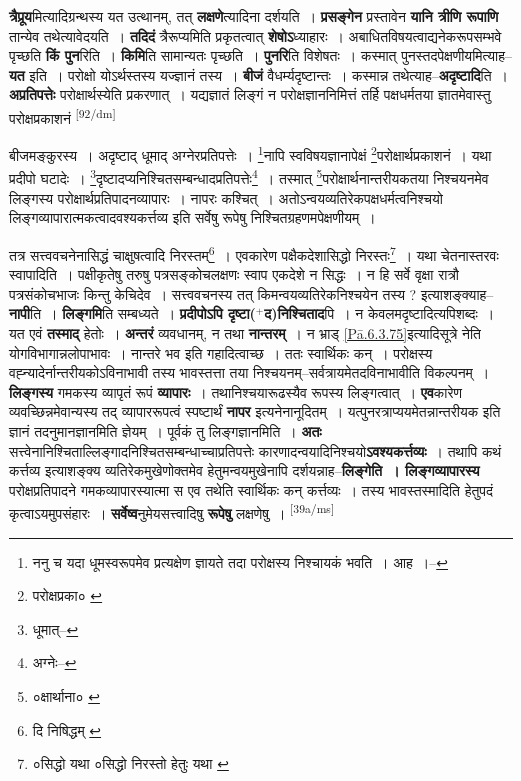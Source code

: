 \documentclass[article,12pt,a4paper]{memoir}
\newcommand{\add}[1]{($^{+}$#1)}
\begin{document}
	  \pstart \textbf{त्रैप्रूय}मित्यादिग्रन्थस्य यत उत्थानम्, तत् \textbf{लक्षणे}त्यादिना दर्शयति । \textbf{प्रसङ्गेन} प्रस्तावेन \textbf{यानि त्रीणि रूपाणि} तान्येव तथेत्यावेदयति । \textbf{तदिदं} त्रैरूप्यमिति प्रकृतत्वात् \textbf{शेषोऽ}ध्याहारः । अबाधितविषयत्वाद्यनेकरूपसम्भवे पृच्छति \textbf{किं पुन}रिति । \textbf{किमि}ति सामान्यतः पृच्छति । \textbf{पुनरि}ति विशेषतः । कस्मात् पुनस्तदपेक्षणीयमित्याह--\textbf{यत} इति । परोक्षो योऽर्थस्तस्य यज्ज्ञानं तस्य । \textbf{बीजं} वैधर्म्यदृष्टान्तः । कस्मान्न तथेत्याह--\textbf{अदृष्टादि}ति । \textbf{अप्रतिपत्तेः} परोक्षार्थस्येति प्रकरणात् । यद्यज्ञातं लिङ्गं न परोक्षज्ञाननिमित्तं तर्हि पक्षधर्मतया ज्ञातमेवास्तु परोक्षप्रकाशनं  \leavevmode\textsuperscript{\rmlatinfont\tiny [92/dm]} 
	  
	बीजमङ्कुरस्य । अदृष्टाद् धूमाद् अग्नेरप्रतिपत्तेः । \footnote{ननु च यदा धूमस्वरूपमेव प्रत्यक्षेण ज्ञायते तदा परोक्षस्य निश्चायकं भवति । आह ।--\cite{dp-msD-n}}नापि स्वविषयज्ञानापेक्षं \footnote{परोक्षप्रका० \cite{dp-msC}}परोक्षार्थप्रकाशनं । यथा प्रदीपो घटादेः । \footnote{धूमात्--\cite{dp-msD-n}}दृष्टादप्यनिश्चितसम्बन्धादप्रतिपत्तेः\footnote{अग्नेः--\cite{dp-msD-n}} । तस्मात् \footnote{०क्षार्थाना० \cite{dp-edE}}परोक्षार्थनान्तरीयकतया निश्चयनमेव लिङ्गस्य परोक्षार्थप्रतिपादनव्यापारः । नापरः कश्चित् । अतोऽन्वयव्यतिरेकपक्षधर्मत्वनिश्चयो लिङ्गव्यापारात्मकत्वादवश्यकर्त्तव्य इति सर्वेषु रूपेषु निश्चितग्रहणमपेक्षणीयम् । 
	  
	तत्र सत्त्ववचनेनासिद्धं चाक्षुषत्वादि निरस्तम्\footnote{दि निषिद्धम् \cite{dp-msB} \cite{dp-msD}} । एवकारेण पक्षैकदेशासिद्धो निरस्तः\footnote{०सिद्धो यथा \cite{dp-msA} \cite{dp-edN} \cite{dp-edP} ०सिद्धो निरस्तो हेतुः यथा \cite{dp-msB} \cite{dp-msD} \cite{dp-edE} \cite{dp-edH}} । यथा चेतनास्तरवः स्वापादिति । पक्षीकृतेषु तरुषु पत्रसङ्कोचलक्षणः स्वाप एकदेशे न सिद्धः । न हि सर्वे वृक्षा रात्रौ पत्रसंकोचभाजः किन्तु केचिदेव । सत्त्ववचनस्य तत् किमन्वयव्यतिरेकनिश्चयेन तस्य ? इत्याशङ्क्याह--\textbf{नापी}ति । \textbf{लिङ्गमि}ति सम्बध्यते । \textbf{प्रदीपोऽपि दृष्टा\add{द}निश्चिताद}पि । न केवलमदृष्टादित्यपिशब्दः । यत एवं \textbf{तस्माद्} हेतोः । \textbf{अन्तरं} व्यवधानम्, न तथा \textbf{नान्तरम्} । न भ्राड् \cref{Pā.6.3.75}इत्यादिसूत्रे नेति योगविभागान्नलोपाभावः । नान्तरे भव इति गहादित्वाच्छ । ततः स्वार्थिकः कन् । परोक्षस्य वह्न्यादेर्नान्तरीयकोऽविनाभावी तस्य भावस्तत्ता तया निश्चयनम्--सर्वत्रायमेतदविनाभावीति विकल्पनम् । \textbf{लिङ्गस्य} गमकस्य व्यापृतं रूपं \textbf{व्यापारः} । तथानिश्चयारूढस्यैव रूपस्य लिङ्गत्वात् । \textbf{एव}कारेण व्यवच्छिन्नमेवान्यस्य तद् व्यापाररूपत्वं स्पष्टार्थं \textbf{नापर} इत्यनेनानूदितम् । यत्पुनरत्राप्ययमेतन्नान्तरीयक इति ज्ञानं तदनुमानज्ञानमिति ज्ञेयम् । पूर्वकं तु लिङ्गज्ञानमिति । \textbf{अतः} सत्त्वेनानिश्चिताल्लिङ्गादनिश्चितसम्बन्धाच्चाप्रतिपत्तेः कारणादन्वयादिनिश्चयो\textbf{ऽवश्यकर्त्तव्यः} । तथापि कथं कर्त्तव्य इत्याशङ्क्य व्यतिरेकमुखेणोक्तमेव हेतुमन्वयमुखेनापि दर्शयन्नाह--\textbf{लिङ्गेति । लिङ्गव्यापारस्य} परोक्षप्रतिपादने गमकव्यापारस्यात्मा स एव तथेति स्वार्थिकः कन् कर्त्तव्यः । तस्य भावस्तस्मादिति हेतुपदं कृत्वाऽयमुपसंहारः । \textbf{सर्वेष्व}नुमेयसत्त्वादिषु \textbf{रूपेषु} लक्षणेषु । \leavevmode\textsuperscript{\rmlatinfont\tiny [39a/ms]}
	\pend
      
\end{document}
